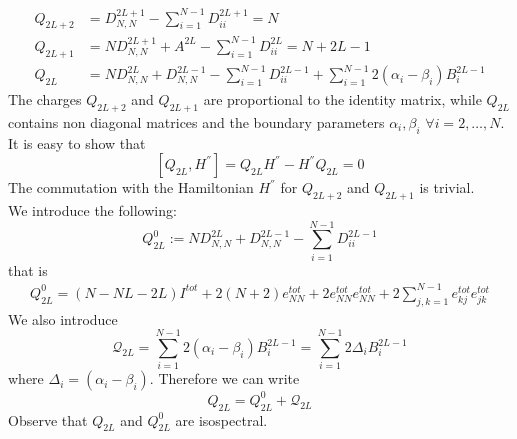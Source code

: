 \documentclass[10pt]{article}
\numberwithin{equation}{section}
\numberwithin{equation}{subsection}
\begin{document}
\begin{align}
Q_{2L+2}&=D_{N,N}^{2L+1}-\sum_{i=1}^{N-1}D_{ii}^{2L+1}=N\\
Q_{2L+1}&=ND_{N,N}^{2L+1}+A^{2L}-\sum_{i=1}^{N-1}D_{ii}^{2L}=N+2L-1\\
Q_{2L\phantom{+}}&=ND_{N,N}^{2L}+D_{N,N}^{2L-1}-\sum_{i=1}^{N-1}D_{ii}^{2L-1}+\sum_{i=1}^{N-1}2(\alpha_{i}-\beta_{i})B_{i}^{2L-1}
\end{align}
The charges $Q_{2L+2}$ and $Q_{2L+1}$ are proportional to the identity matrix, while $Q_{2L}$ contains non diagonal matrices and the boundary parameters $\alpha_{i},\beta_{i}$ $\forall i=2,\ldots,N$.\\
It is easy to show that 
\begin{equation}
\left[Q_{2L},H^{''}\right]=Q_{2L}H^{''}-H^{''}Q_{2L}=0
\end{equation}
The commutation with the Hamiltonian $H^{''}$ for $Q_{2L+2}$ and $Q_{2L+1}$ is trivial. \\
We introduce the following:
\begin{equation}
Q_{2L}^{0}:=ND_{N,N}^{2L}+D_{N,N}^{2L-1}-\sum_{i=1}^{N-1}D_{ii}^{2L-1}
\end{equation}
that is 
\begin{equation}\label{Q0Exp}
\begin{split}
Q_{2L}^{0}=(N-NL-2L)I^{tot}+2(N+2)e_{NN}^{tot}+2e_{NN}^{tot}e_{NN}^{tot}+2\sum_{j,k=1}^{N-1}e_{kj}^{tot}e_{jk}^{tot}
\end{split}
\end{equation}
We also introduce 
\begin{equation}\label{Q-nonDiag}
\mathcal{Q}_{2L}=\sum_{i=1}^{N-1}2(\alpha_{i}-\beta_{i})B_{i}^{2L-1}=\sum_{i=1}^{N-1}2\Delta_{i}B_{i}^{2L-1}
\end{equation}
where $\Delta_{i}=(\alpha_{i}-\beta_{i})$. 
Therefore we can write 
\begin{equation}
Q_{2L}=Q_{2L}^{0}+\mathcal{Q}_{2L}
\end{equation}
Observe that $Q_{2L}$ and $Q_{2L}^{0}$ are isospectral. \\
\end{document}
